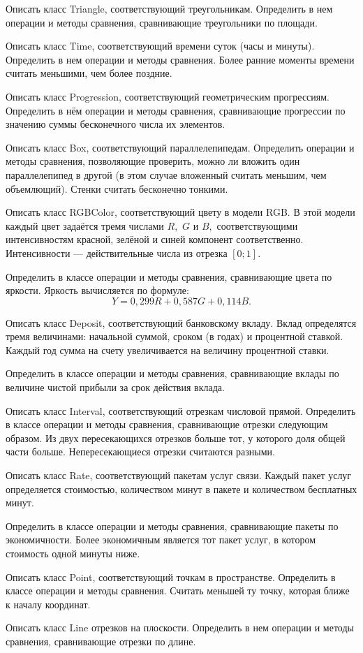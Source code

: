 \task Описать класс Triangle, соответствующий треугольникам.
Определить в нем операции и методы сравнения, сравнивающие
треугольники по площади.

\task Описать класс Time, соответствующий времени суток (часы и
минуты). Определить в нем операции и методы сравнения. Более ранние
моменты времени считать меньшими, чем более поздние.

\task Описать класс Progression, соответствующий геометрическим
прогрессиям. Определить в нём операции и методы сравнения,
сравнивающие прогрессии по значению суммы бесконечного числа их
элементов.

\task Описать класс Box, соответствующий параллелепипедам. Определить
операции и методы сравнения, позволяющие проверить, можно ли вложить
один параллелепипед в другой (в этом случае вложенный считать меньшим,
чем объемлющий). Стенки считать бесконечно тонкими.

\task Описать класс RGBColor, соответствующий цвету в модели RGB. В
этой модели каждый цвет задаётся тремя числами $R,$ $G$ и $B,$
соответствующими интенсивностям красной, зелёной и синей компонент
соответственно. Интенсивности — действительные числа из отрезка
$[0; 1]$.

Определить в классе операции и методы сравнения, сравнивающие цвета по
яркости. Яркость вычисляется по формуле:
\[
Y = 0{,}299 R + 0{,}587 G + 0{,}114 B.
\]

\task Описать класс Deposit, соответствующий банковскому вкладу. Вклад
определятся тремя величинами: начальной суммой, сроком (в годах) и
процентной ставкой. Каждый год сумма на счету увеличивается на
величину процентной ставки.

Определить в классе операции и методы сравнения, сравнивающие вклады
по величине чистой прибыли за срок действия вклада.

\task Описать класс Interval, соответствующий отрезкам числовой
прямой. Определить в классе операции и методы сравнения, сравнивающие
отрезки следующим образом. Из двух пересекающихся отрезков больше тот,
у которого доля общей части больше. Непересекающиеся отрезки считаются
разными.

\task Описать класс Rate, соответствующий пакетам услуг связи. Каждый
пакет услуг определяется стоимостью, количеством минут в пакете и
количеством бесплатных минут.

Определить в классе операции и методы сравнения, сравнивающие пакеты
по экономичности. Более экономичным является тот пакет услуг, в
котором стоимость одной минуты ниже.

\task Описать класс Point, соответствующий точкам в пространстве.
Определить в классе операции и методы сравнения. Считать меньшей ту
точку, которая ближе к началу координат.

\task Описать класс Line отрезков на плоскости. Определить в нем
операции и методы сравнения, сравнивающие отрезки по длине.
